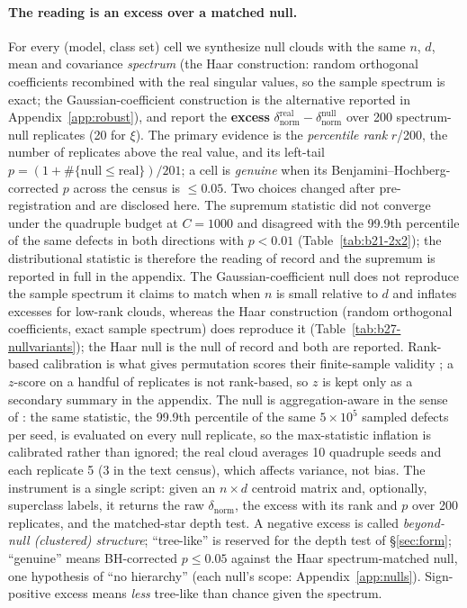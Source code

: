 \paragraph{The reading is an excess over a matched null.} For every (model, class set) cell we synthesize null clouds with the same $n$, $d$, mean and covariance \emph{spectrum} (the Haar construction: random orthogonal coefficients recombined with the real singular values, so the sample spectrum is exact; the Gaussian-coefficient construction is the alternative reported in Appendix~\ref{app:robust}), and report the \textbf{excess} $\delta_{\text{norm}}^{\text{real}}-\delta_{\text{norm}}^{\text{null}}$ over 200 spectrum-null replicates (20 for $\xi$). The primary evidence is the \emph{percentile rank} $r$/200, the number of replicates above the real value, and its left-tail $p=(1+\#\{\text{null}\le\text{real}\})/201$; a cell is \emph{genuine} when its Benjamini--Hochberg-corrected $p$ across the census is $\le0.05$. Two choices changed after pre-registration and are disclosed here. The supremum statistic did not converge under the quadruple budget at $C{=}1000$ and disagreed with the 99.9th percentile of the same defects in both directions with $p<0.01$ (Table~\ref{tab:b21-2x2}); the distributional statistic is therefore the reading of record and the supremum is reported in full in the appendix. The Gaussian-coefficient null does not reproduce the sample spectrum it claims to match when $n$ is small relative to $d$ and inflates excesses for low-rank clouds, whereas the Haar construction (random orthogonal coefficients, exact sample spectrum) does reproduce it (Table~\ref{tab:b27-nullvariants}); the Haar null is the null of record and both are reported. Rank-based calibration is what gives permutation scores their finite-sample validity \citep[\S5.1]{groger2026aristotelian}; a $z$-score on a handful of replicates is not rank-based, so $z$ is kept only as a secondary summary in the appendix. The null is aggregation-aware in the sense of \citet[\S5.2]{groger2026aristotelian}: the same statistic, the 99.9th percentile of the same $5{\times}10^5$ sampled defects per seed, is evaluated on every null replicate, so the max-statistic inflation is calibrated rather than ignored; the real cloud averages 10 quadruple seeds and each replicate 5 (3 in the text census), which affects variance, not bias. The instrument is a single script: given an $n{\times}d$ centroid matrix and, optionally, superclass labels, it returns the raw $\delta_{\text{norm}}$, the excess with its rank and $p$ over 200 replicates, and the matched-star depth test. A negative excess is called \emph{beyond-null (clustered) structure}; ``tree-like'' is reserved for the depth test of \S\ref{sec:form}; ``genuine'' means BH-corrected $p\le0.05$ against the Haar spectrum-matched null, one hypothesis of ``no hierarchy'' (each null's scope: Appendix~\ref{app:nulls}). Sign-positive excess means \emph{less} tree-like than chance given the spectrum.

